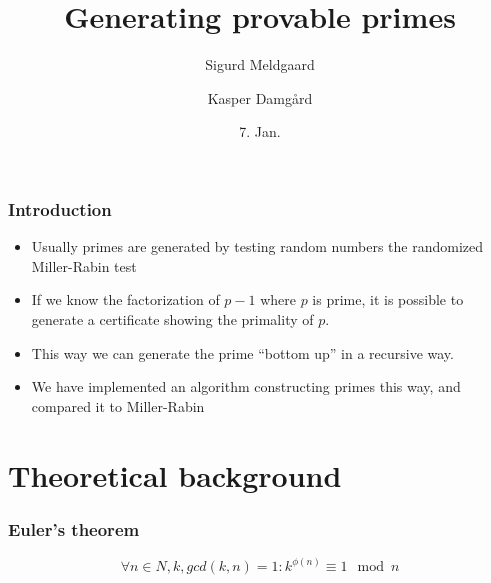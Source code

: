 \documentclass{beamer}
\title{Generating provable primes}
\author{Sigurd Meldgaard \and Kasper Damgård}
\date{7. Jan.}
\begin{document}
\maketitle

\begin{frame}
  \frametitle{Introduction} 

  \begin{itemize}
\item 
    Usually primes are generated by testing random numbers the
    randomized Miller-Rabin test 
\pause
\item If we know the factorization
    of $p-1$ where $p$ is prime, it is possible to generate a
    certificate showing the primality of $p$.  
\pause 
\item This way we
    can generate the prime ``bottom up'' in a recursive way.
    \pause
  \item We have implemented an algorithm constructing primes this way,
    and compared it to Miller-Rabin
  \end{itemize}
\end{frame}

\section{Theoretical background}
\begin{frame}
\frametitle{Euler's theorem}
\[
\forall n\in N, k, gcd(k,n)=1: k^{\phi(n)} \equiv 1 \mod n
\]
\end{frame}
\end{document}
